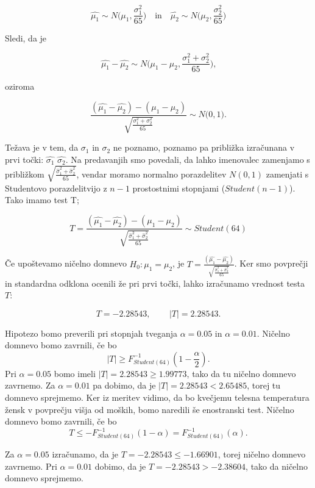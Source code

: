 \documentclass[12pt, a4paper]{article}
\begin{document}
$$\hat{\mu_1} \sim N\Big(\mu_1, \frac{\sigma_1^2}{65}\Big) \quad \text{in} 
\quad \hat{\mu_2} \sim N\Big(\mu_2, \frac{\sigma_2^2}{65}\Big)$$

Sledi, da je 

$$\hat{\mu_1} - \hat{\mu_2} \sim N\Big(\mu_1 - \mu_2, \frac{\sigma_1^2 + 
\sigma_2^2}{65}\Big) \text{,}
$$

oziroma

$$ \frac{(\hat{\mu_1} - \hat{\mu_2}) - (\mu_1 - \mu_2)}
{\sqrt{\frac{\sigma_1^2 + \sigma_2^2}{65}}}
\sim N\big(0, 1\big) \text{.}
$$ 

Težava je v tem, da $\sigma_1$ in $\sigma_2$ ne poznamo, poznamo pa približka
izračunana v prvi točki: $\hat{\sigma_1}$ $\hat{\sigma_2}$. Na predavanjih
smo povedali, da lahko imenovalec
zamenjamo s približkom ${\sqrt{\frac{\hat{\sigma}_1^2 + \hat{\sigma}_2^2}{65}}} $, 
vendar moramo normalno porazdelitev $N(0,1)$ zamenjati s Studentovo porazdelitvijo
z $n-1$ prostostnimi stopnjami ($Student(n-1)$). Tako imamo test T;

$$T = \frac{(\hat{\mu_1} - \hat{\mu_2}) - (\mu_1 - \mu_2)}
{\sqrt{\frac{\hat{\sigma}_1^2 + \hat{\sigma}_2^2}{65}}}
\sim Student(64)
$$ 

Če upoštevamo ničelno domnevo $H_0 : \mu_1 = \mu_2$, je $T = \frac{(\hat{\mu_1}
 - \hat{\mu_2})} {\sqrt{\frac{\hat{\sigma}_1^2 + \hat{\sigma}_2^2}{65}}}$. Ker 
smo povprečji in standardna odklona ocenili že pri prvi točki, lahko izračunamo
vrednost testa $T$:

$$T = -2.28543 \text{, } \qquad |T| = 2.28543 \text{.}
$$

Hipotezo bomo preverili pri stopnjah tveganja $\alpha = 0.05$ in $\alpha = 0.01$.
Ničelno domnevo bomo zavrnili, če bo 
$$|T| \geq F^{-1}_{Student(64)}(1-\frac{\alpha}{2}) \text{.}
$$ 
Pri $\alpha = 0.05$ bomo imeli $|T| = 2.28543 \geq 1.99773$, tako da tu ničelno
domnevo zavrnemo. Za $\alpha = 0.01$ pa dobimo, da je $|T| = 2.28543 < 2.65485$,
torej tu domnevo sprejmemo.
Ker iz meritev vidimo, da bo kvečjemu telesna temperatura žensk v povprečju 
višja od moških, bomo naredili še enostranski test. Ničelno domnevo bomo zavrnili, 
če bo 
$$T \leq - F^{-1}_{Student(64)}(1-\alpha) = F^{-1}_{Student(64)}(\alpha) \text{.}
$$

Za $\alpha = 0.05$ izračunamo, da je $T = -2.28543 \leq -1.66901$, torej ničelno domnevo 
zavrnemo. Pri $\alpha = 0.01$ dobimo, da je $T = -2.28543 > -2.38604$, tako da 
ničelno domnevo sprejmemo. 

\end{document}
